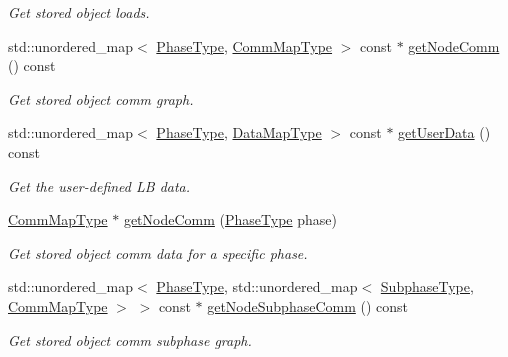 \begin{DoxyCompactItemize}
\begin{DoxyCompactList}\small\item\em Get stored object loads. \end{DoxyCompactList}\item 
std\+::unordered\+\_\+map$<$ \hyperlink{namespacevt_a46ce6733d5cdbd735d561b7b4029f6d7}{Phase\+Type}, \hyperlink{namespacevt_1_1vrt_1_1collection_1_1balance_a01ee1fb0ae2da1d2ab7fdca3be9ae351}{Comm\+Map\+Type} $>$ const  $\ast$ \hyperlink{structvt_1_1vrt_1_1collection_1_1balance_1_1_node_l_b_data_a01ac3980585c93769570fd4e76ea9218}{get\+Node\+Comm} () const
\begin{DoxyCompactList}\small\item\em Get stored object comm graph. \end{DoxyCompactList}\item 
std\+::unordered\+\_\+map$<$ \hyperlink{namespacevt_a46ce6733d5cdbd735d561b7b4029f6d7}{Phase\+Type}, \hyperlink{namespacevt_1_1vrt_1_1collection_1_1balance_a5794b6bc763c88c78228074bd0d1a50f}{Data\+Map\+Type} $>$ const  $\ast$ \hyperlink{structvt_1_1vrt_1_1collection_1_1balance_1_1_node_l_b_data_a73b93e4e239cc32982d5474fca1f7b64}{get\+User\+Data} () const
\begin{DoxyCompactList}\small\item\em Get the user-\/defined LB data. \end{DoxyCompactList}\item 
\hyperlink{namespacevt_1_1vrt_1_1collection_1_1balance_a01ee1fb0ae2da1d2ab7fdca3be9ae351}{Comm\+Map\+Type} $\ast$ \hyperlink{structvt_1_1vrt_1_1collection_1_1balance_1_1_node_l_b_data_a6805869aeb1d424289ddb2b6be653595}{get\+Node\+Comm} (\hyperlink{namespacevt_a46ce6733d5cdbd735d561b7b4029f6d7}{Phase\+Type} phase)
\begin{DoxyCompactList}\small\item\em Get stored object comm data for a specific phase. \end{DoxyCompactList}\item 
std\+::unordered\+\_\+map$<$ \hyperlink{namespacevt_a46ce6733d5cdbd735d561b7b4029f6d7}{Phase\+Type}, std\+::unordered\+\_\+map$<$ \hyperlink{namespacevt_ae78cbfdf1e57470e33eedb074f2beeba}{Subphase\+Type}, \hyperlink{namespacevt_1_1vrt_1_1collection_1_1balance_a01ee1fb0ae2da1d2ab7fdca3be9ae351}{Comm\+Map\+Type} $>$ $>$ const  $\ast$ \hyperlink{structvt_1_1vrt_1_1collection_1_1balance_1_1_node_l_b_data_a783e8620fff1016d7073a3747379127f}{get\+Node\+Subphase\+Comm} () const
\begin{DoxyCompactList}\small\item\em Get stored object comm subphase graph. \end{DoxyCompactList}\item 

\end{DoxyCompactItemize}

